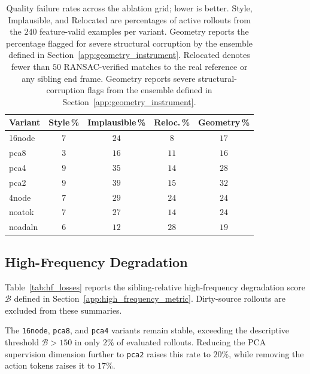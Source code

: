 \documentclass[letterpaper]{article} %
\begin{document}
\begin{table}[t]
\centering
\small
\setlength{\tabcolsep}{4pt}
\caption{
    Quality failure rates across the ablation grid; lower is better.
    Style, Implausible, and Relocated are percentages of active rollouts from
    the $240$ feature-valid examples per variant. Geometry reports the
    percentage flagged for severe structural corruption by the ensemble
    defined in Section~\ref{app:geometry_instrument}. Relocated denotes fewer
    than $50$ RANSAC-verified matches to the real reference or any sibling end
    frame. Geometry reports severe structural-corruption flags from the ensemble
    defined in Section~\ref{app:geometry_instrument}.
}
\label{tab:quality_ablation}
\begin{tabular}{lcccc}
\toprule
Variant
& Style\,\%
& Implausible\,\%
& Reloc.\,\%
& Geometry\,\% \\
\midrule
16node  & $7$ & $24$ & $8$  & $17$ \\
pca8    & $3$ & $16$ & $11$ & $16$ \\
pca4    & $9$ & $35$ & $14$ & $28$ \\
pca2    & $9$ & $39$ & $15$ & $32$ \\
4node   & $7$ & $29$ & $24$ & $24$ \\
noatok  & $7$ & $27$ & $14$ & $24$ \\
noadaln & $6$ & $12$ & $28$ & $19$ \\
\bottomrule
\end{tabular}
\end{table}


%


\subsection{High-Frequency Degradation}
\label{app:high_frequency_results}

Table~\ref{tab:hf_losses} reports the sibling-relative high-frequency
degradation score $\mathcal B$ defined in
Section~\ref{app:high_frequency_metric}. Dirty-source rollouts are excluded
from these summaries.

The \texttt{16node}, \texttt{pca8}, and \texttt{pca4} variants remain
stable, exceeding the descriptive threshold $\mathcal B>150$ in only $2\%$
of evaluated rollouts. Reducing the PCA supervision dimension further to
\texttt{pca2} raises this rate to $20\%$, while removing the action tokens
raises it to $17\%$.
\end{document}
